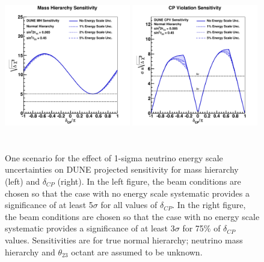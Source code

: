 \begin{figure}[h!]
\centering
\includegraphics[width=0.49\textwidth,height=6.7cm]{figures/mh_230ktmwyear_varyesyst}
\includegraphics[width=0.49\textwidth,height=6.7cm]{figures/cpv_890ktmwyear_varyesyst}
  \caption{One scenario for the effect of 1-sigma  neutrino energy scale uncertainties on
DUNE projected sensitivity for mass hierarchy (left) and $\delta_{CP}$ 
(right).  In the left figure, the beam conditions are chosen so that the case with no energy scale systematic provides a significance of at least 5$\sigma$ for all values of $\delta_{CP}$. In the right figure, the beam conditions are chosen so that the case with no energy scale systematic provides a significance of at least 3$\sigma$ for 75\% of $\delta_{CP}$ values.  Sensitivities are for true normal hierarchy; neutrino mass hierarchy and $\theta_{23}$ octant are assumed to be unknown.
}
\label{fig:global_escale_sens}
\end{figure}

